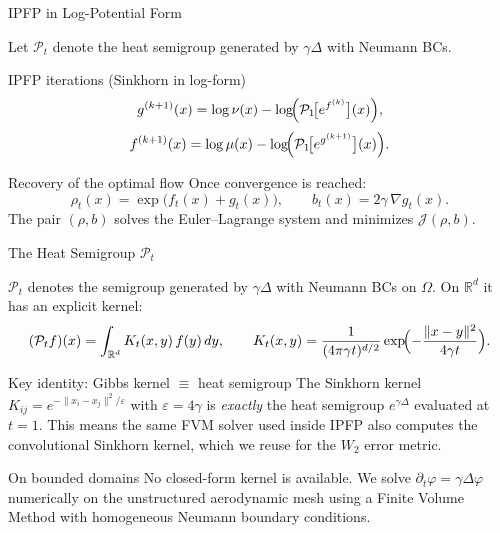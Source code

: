 \documentclass[aspectratio=169]{beamer}
\begin{document}
\begin{frame}{IPFP in Log-Potential Form}

Let $\mathcal{P}_t$ denote the heat semigroup generated by $\gamma\Delta$ with Neumann BCs.

\begin{block}{IPFP iterations (Sinkhorn in log-form)}
\[
    g^{(k+1)}(x) = \log\nu(x) - \log\!\Bigl(\mathcal{P}_1\!\bigl[e^{f^{(k)}}\bigr](x)\Bigr),
\]
\[
    f^{(k+1)}(x) = \log\mu(x) - \log\!\Bigl(\mathcal{P}_1\!\bigl[e^{g^{(k+1)}}\bigr](x)\Bigr).
\]
\end{block}

\begin{block}{Recovery of the optimal flow}
Once convergence is reached:
\[
    \rho_t(x) = \exp\!\bigl(f_t(x) + g_t(x)\bigr), \qquad b_t(x) = 2\gamma\,\nabla g_t(x).
\]
The pair $(\rho, b)$ solves the Euler–Lagrange system and minimizes $\mathcal{J}(\rho, b)$.
\end{block}

\end{frame}

\begin{frame}{The Heat Semigroup $\mathcal{P}_t$}

$\mathcal{P}_t$ denotes the semigroup generated by $\gamma\Delta$ with Neumann BCs on $\Omega$.
On $\mathbb{R}^d$ it has an explicit kernel:
\[
    (\mathcal{P}_t f)(x) = \int_{\mathbb{R}^d} K_t(x,y)\,f(y)\,dy,
    \qquad
    K_t(x,y) = \frac{1}{(4\pi\gamma t)^{d/2}}\exp\!\Bigl(-\frac{\|x-y\|^2}{4\gamma t}\Bigr).
\]

\begin{block}{Key identity: Gibbs kernel $\equiv$ heat semigroup}
The Sinkhorn kernel $K_{ij} = e^{-\|x_i-x_j\|^2/\varepsilon}$ with $\varepsilon = 4\gamma$ is
\emph{exactly} the heat semigroup $e^{\gamma\Delta}$ evaluated at $t=1$.
This means the same FVM solver used inside IPFP also computes the convolutional
Sinkhorn kernel, which we reuse for the $W_2$ error metric.
\end{block}

\begin{block}{On bounded domains}
No closed-form kernel is available. We solve $\partial_t\varphi = \gamma\Delta\varphi$ numerically
on the unstructured aerodynamic mesh using a Finite Volume Method with
homogeneous Neumann boundary conditions.
\end{block}

\end{frame}
\end{document}

